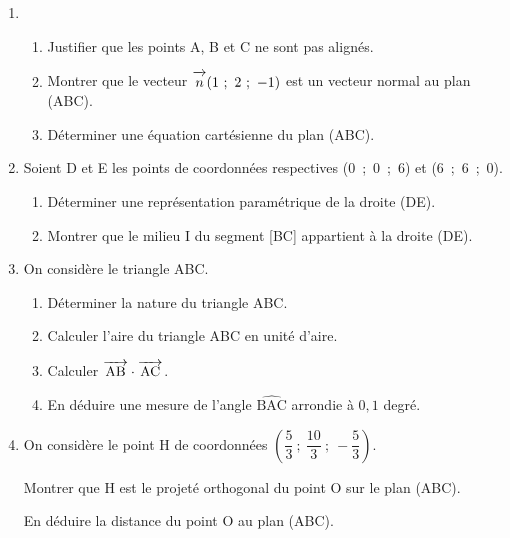 \documentclass[11pt]{article}
\newcommand{\vect}[1]{\overrightarrow{\,\mathstrut#1\,}}
\begin{document}
\bigskip

\begin{enumerate}
\item 
	\begin{enumerate}
		\item Justifier que les points A, B et C ne sont pas alignés.
		\item Montrer que le vecteur $\vect{n}(1~;~2~;~-1)$ est
un vecteur normal au plan (ABC).
		\item Déterminer une équation cartésienne du plan (ABC).
	\end{enumerate}
\item Soient D et E les points de coordonnées respectives (0~;~0~;~6) et (6~;~6~;~0).
	\begin{enumerate}
		\item Déterminer une représentation paramétrique de la droite (DE).
		\item Montrer que le milieu I du segment [BC] appartient à la droite (DE).
	\end{enumerate}	
\item On considère le triangle ABC.
	\begin{enumerate}
		\item Déterminer la nature du triangle ABC.
		\item Calculer l'aire du triangle ABC en unité d'aire.
		\item Calculer $\vect{\text{AB}}  \cdot \vect{\text{AC}}$.
		\item En déduire une mesure de l'angle $\widehat{\text{BAC}}$ arrondie à $0,1$ degré.
	\end{enumerate}	
\item On considère le point H de coordonnées $\left(\dfrac53~;~\dfrac{10}{3}~;~- \dfrac53\right)$.

Montrer que H est le projeté orthogonal du point O sur le plan (ABC). 

En déduire la distance du point O au plan (ABC).
\end{enumerate}
\end{document}
